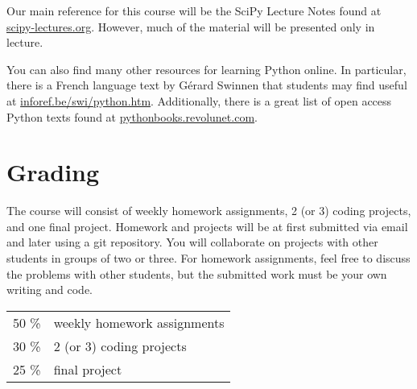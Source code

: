 \documentclass[a4paper,10pt]{article} %
\begin{document}
Our main reference for this course will be the SciPy Lecture Notes found at \href{http://www.scipy-lectures.org}{scipy-lectures.org}. However, much of the material will be presented only in lecture.

You can also find many other resources for learning Python online. In particular, there is a French language text by G\'{e}rard Swinnen that students may find useful at \href{http://inforef.be/swi/download/apprendre_python3_5.pdf}{inforef.be/swi/python.htm}. Additionally, there is a great list of open access Python texts found at \href{http://pythonbooks.revolunet.com}{pythonbooks.revolunet.com}.

\section{Grading} 

The course will consist of weekly homework assignments, 2 (or 3) coding projects, and one final project. Homework and projects will be at first submitted via email and later using a git repository. You will collaborate on projects with other students in groups of two or three. For homework assignments, feel free to discuss the problems with other students, but the submitted work must be your own writing and code.
\begin{center}
\begin{tabular}{r|l}
50 \% & weekly homework assignments \\
30 \% & 2 (or 3) coding projects\\
25 \% & final project\\
\end{tabular}
\end{center}
\end{document}
